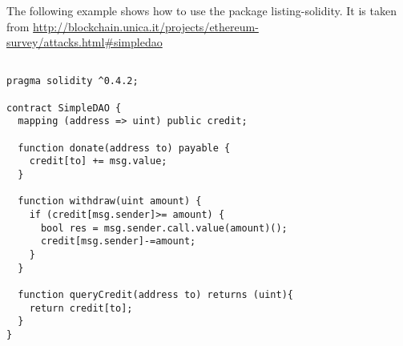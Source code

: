 \documentclass{scrartcl}
\begin{document}
The following example shows how to use the package listing-solidity.
It is taken from
\url{http://blockchain.unica.it/projects/ethereum-survey/attacks.html#simpledao}

\begin{lstlisting}[language=Solidity, frame=single]

pragma solidity ^0.4.2;

contract SimpleDAO {   
  mapping (address => uint) public credit;
    
  function donate(address to) payable {
    credit[to] += msg.value;
  }
    
  function withdraw(uint amount) {
    if (credit[msg.sender]>= amount) {
      bool res = msg.sender.call.value(amount)();
      credit[msg.sender]-=amount;
    }
  }  

  function queryCredit(address to) returns (uint){
    return credit[to];
  }
}

\end{lstlisting}
\end{document}
